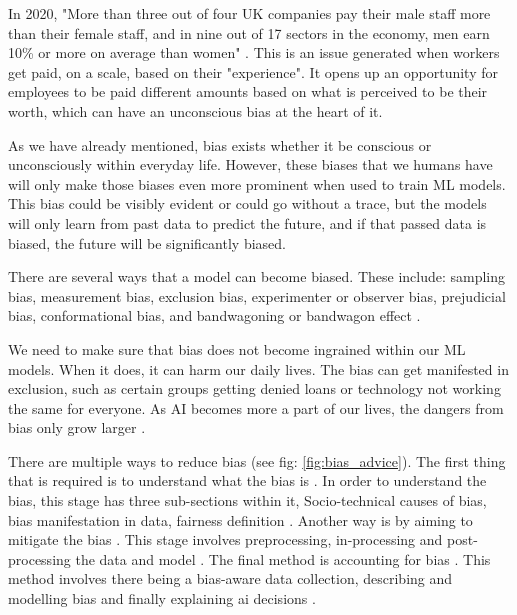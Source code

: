 \documentclass{sigchi}
\begin{document}
	
	In 2020, "More than three out of four UK companies pay their male staff more than their female staff, and in nine out of 17 sectors in the economy, men earn 10\% or more on average than women" \cite{gender_pay_FT}. This is an issue generated when workers get paid, on a scale, based on their "experience". It opens up an opportunity for employees to be paid different amounts based on what is perceived to be their worth, which can have an unconscious bias at the heart of it. %
	
	As we have already mentioned, bias exists whether it be conscious or unconsciously within everyday life. However, these biases that we humans have will only make those biases even more prominent when used to train ML models. This bias could be visibly evident or could go without a trace, but the models will only learn from past data to predict the future, and if that passed data is biased, the future will be significantly biased.
	
	There are several ways that a model can become biased. These include: sampling bias, measurement bias, exclusion bias, experimenter or observer bias, prejudicial bias, conformational bias, and bandwagoning or bandwagon effect \cite{6_ways_bias}. 
	
	We need to make sure that bias does not become ingrained within our ML models. When it does, it can harm our daily lives. The bias can get manifested in exclusion, such as certain groups getting denied loans or technology not working the same for everyone. As AI becomes more a part of our lives, the dangers from bias only grow larger \cite{6_ways_bias}.
	
	There are multiple ways to reduce bias (see fig: \ref{fig:bias_advice}). The first thing that is required is to understand what the bias is \cite{three}. In order to understand the bias, this stage has three sub-sections within it, Socio-technical causes of bias, bias manifestation in data, fairness definition \cite{three}. Another way is by aiming to mitigate the bias \cite{three}. This stage involves preprocessing, in-processing and post-processing the data and model \cite{three}. The final method is accounting for bias \cite{three}. This method involves there being a bias-aware data collection, describing and modelling bias and finally explaining ai decisions \cite{three}. 
	
\end{document}
